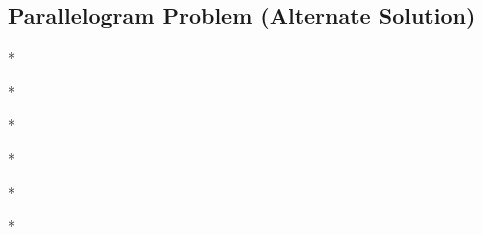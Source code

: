 \label{13-0304-1}

\subsection{Parallelogram Problem (Alternate Solution)}

\begin{center} * \end{center}
\begin{center} *\space\space\space\space* \end{center}
\begin{center} *\space\space\space\space*\space\space\space\space* \end{center}
\begin{center} *\space\space\space\space*\space\space\space\space*\space\space\space\space* \end{center}
\begin{center} *\space\space\space\space*\space\space\space\space*\space\space\space\space*\space\space\space\space* \end{center}
\begin{center} *\space\space\space\space*\space\space\space\space*\space\space\space\space*\space\space\space\space*\space\space\space\space* \end{center}


